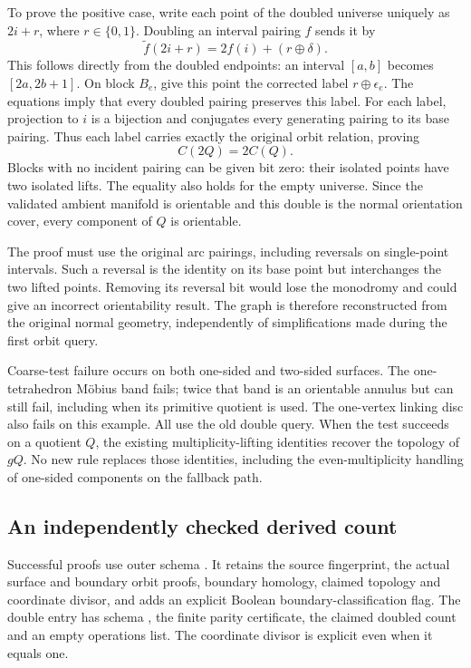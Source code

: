 To prove the positive case, write each point of the doubled universe
uniquely as $2i+r$, where $r\in\{0,1\}$. Doubling an interval pairing
$f$ sends it by
\[
 \widetilde f(2i+r)=2f(i)+(r\mathbin\oplus\delta).
\]
This follows directly from the doubled endpoints: an interval $[a,b]$
becomes $[2a,2b+1]$. On block $B_e$, give this point the corrected label
$r\mathbin\oplus\epsilon_e$. The equations imply that every doubled
pairing preserves this label. For each label, projection to $i$ is a
bijection and conjugates every generating pairing to its base pairing.
Thus each label carries exactly the original orbit relation, proving
\[
 C(2Q)=2C(Q).
\]
Blocks with no incident pairing can be given bit zero: their isolated
points have two isolated lifts. The equality also holds for the empty
universe. Since the validated ambient manifold is orientable and this
double is the normal orientation cover, every component of $Q$ is
orientable.

The proof must use the original arc pairings, including reversals on
single-point intervals. Such a reversal is the identity on its base
point but interchanges the two lifted points. Removing its reversal bit
would lose the monodromy and could give an incorrect orientability result.
The graph is therefore reconstructed from the original normal geometry,
independently of simplifications made during the first orbit query.

Coarse-test failure occurs on both one-sided and two-sided surfaces.
The one-tetrahedron M\"obius band fails; twice that band is an orientable
annulus but can still fail, including when its primitive quotient is used.
The one-vertex linking disc also fails on this example. All use the old
double query. When the test succeeds on a quotient $Q$, the existing
multiplicity-lifting identities recover the topology of $gQ$. No new
rule replaces those identities, including the even-multiplicity handling
of one-sided components on the fallback path.

\subsection{An independently checked derived count}

Successful proofs use outer schema .
It retains the source fingerprint, the actual surface and boundary orbit
proofs, boundary homology, claimed topology and coordinate divisor, and
adds an explicit Boolean boundary-classification flag. The double entry
has schema , the finite parity
certificate, the claimed doubled count and an empty operations list.
The coordinate divisor is explicit even when it equals one.

